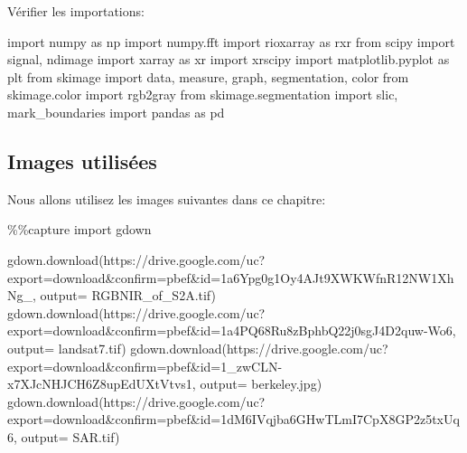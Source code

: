 \documentclass[
  11pt,
  letterpaper,
  open=any,
  twoside=false,
  french]{scrbook}
\newenvironment{Shaded}{\begin{snugshade}}{\end{snugshade}}
\newcommand{\ImportTok}[1]{\textcolor[rgb]{0.00,0.46,0.62}{#1}}
\newcommand{\NormalTok}[1]{\textcolor[rgb]{0.00,0.23,0.31}{#1}}
\newcommand{\OperatorTok}[1]{\textcolor[rgb]{0.37,0.37,0.37}{#1}}
\newcommand{\StringTok}[1]{\textcolor[rgb]{0.13,0.47,0.30}{#1}}
\begin{document}
Vérifier les importations:

\begin{Shaded}
\begin{Highlighting}[]
\ImportTok{import}\NormalTok{ numpy }\ImportTok{as}\NormalTok{ np}
\ImportTok{import}\NormalTok{ numpy.fft}
\ImportTok{import}\NormalTok{ rioxarray }\ImportTok{as}\NormalTok{ rxr}
\ImportTok{from}\NormalTok{ scipy }\ImportTok{import}\NormalTok{ signal, ndimage}
\ImportTok{import}\NormalTok{ xarray }\ImportTok{as}\NormalTok{ xr}
\ImportTok{import}\NormalTok{ xrscipy}
\ImportTok{import}\NormalTok{ matplotlib.pyplot }\ImportTok{as}\NormalTok{ plt}
\ImportTok{from}\NormalTok{ skimage }\ImportTok{import}\NormalTok{ data, measure, graph, segmentation, color}
\ImportTok{from}\NormalTok{ skimage.color }\ImportTok{import}\NormalTok{ rgb2gray}
\ImportTok{from}\NormalTok{ skimage.segmentation }\ImportTok{import}\NormalTok{ slic, mark\_boundaries}
\ImportTok{import}\NormalTok{ pandas }\ImportTok{as}\NormalTok{ pd}
\end{Highlighting}
\end{Shaded}

\subsection{Images utilisées}\label{images-utilisuxe9es-1}

Nous allons utilisez les images suivantes dans ce chapitre:

\begin{Shaded}
\begin{Highlighting}[]
\OperatorTok{\%\%}\NormalTok{capture}
\ImportTok{import}\NormalTok{ gdown}

\NormalTok{gdown.download(}\StringTok{\textquotesingle{}https://drive.google.com/uc?export=download\&confirm=pbef\&id=1a6Ypg0g1Oy4AJt9XWKWfnR12NW1XhNg\_\textquotesingle{}}\NormalTok{, output}\OperatorTok{=} \StringTok{\textquotesingle{}RGBNIR\_of\_S2A.tif\textquotesingle{}}\NormalTok{)}
\NormalTok{gdown.download(}\StringTok{\textquotesingle{}https://drive.google.com/uc?export=download\&confirm=pbef\&id=1a4PQ68Ru8zBphbQ22j0sgJ4D2quw{-}Wo6\textquotesingle{}}\NormalTok{, output}\OperatorTok{=} \StringTok{\textquotesingle{}landsat7.tif\textquotesingle{}}\NormalTok{)}
\NormalTok{gdown.download(}\StringTok{\textquotesingle{}https://drive.google.com/uc?export=download\&confirm=pbef\&id=1\_zwCLN{-}x7XJcNHJCH6Z8upEdUXtVtvs1\textquotesingle{}}\NormalTok{, output}\OperatorTok{=} \StringTok{\textquotesingle{}berkeley.jpg\textquotesingle{}}\NormalTok{)}
\NormalTok{gdown.download(}\StringTok{\textquotesingle{}https://drive.google.com/uc?export=download\&confirm=pbef\&id=1dM6IVqjba6GHwTLmI7CpX8GP2z5txUq6\textquotesingle{}}\NormalTok{, output}\OperatorTok{=} \StringTok{\textquotesingle{}SAR.tif\textquotesingle{}}\NormalTok{)}
\end{Highlighting}
\end{Shaded}
\end{document}
